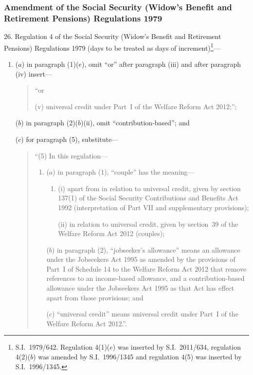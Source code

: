 \documentclass[12pt,a4paper]{article}
\begin{document}
\subsubsection[26. Amendment of the Social Security (Widow’s Benefit and Retirement Pensions) Regulations 1979]{Amendment of the Social Security (Widow’s Benefit and Retirement Pensions) Regulations 1979}

26.  Regulation 4 of the Social Security (Widow’s Benefit and Retirement Pensions) Regulations 1979 (days to be treated as days of increment)\footnote{S.I.~1979/642. Regulation 4(1)($e$) was inserted by S.I.~2011/634, regulation 4(2)($b$) was amended by S.I.~1996/1345 and regulation 4(5) was inserted by S.I.~1996/1345.}—
\begin{enumerate}\item[]
($a$) in paragraph (1)($e$), omit “or” after paragraph (iii)  and after paragraph (iv)  insert—
\begin{quotation}
“or

(v)  universal credit under Part~I of the Welfare Reform Act 2012;”;
\end{quotation}

($b$) in paragraph (2)($b$)(ii), omit “contribution-based”; and

($c$) for paragraph (5), substitute—
\begin{quotation}
“(5) In this regulation—
\begin{enumerate}\item[]
($a$) in paragraph (1), “couple” has the meaning—
\begin{enumerate}\item[]
(i) apart from in relation to universal credit, given by section 137(1) of the Social Security Contributions and Benefits Act 1992 (interpretation of Part VII and supplementary provisions);

(ii) in relation to universal credit, given by section~39 of the Welfare Reform Act 2012 (couples);
\end{enumerate}

($b$) in paragraph (2), “jobseeker’s allowance” means an allowance under the Jobseekers Act 1995 as amended by the provisions of Part~I of Schedule 14 to the Welfare Reform Act 2012 that remove references to an income-based allowance, and a contribution-based allowance under the Jobseekers Act 1995 as that Act has effect apart from those provisions; and

($c$) “universal credit” means universal credit under Part~I of the Welfare Reform Act 2012.”.
\end{enumerate}
\end{quotation}
\end{enumerate}
\end{document}
